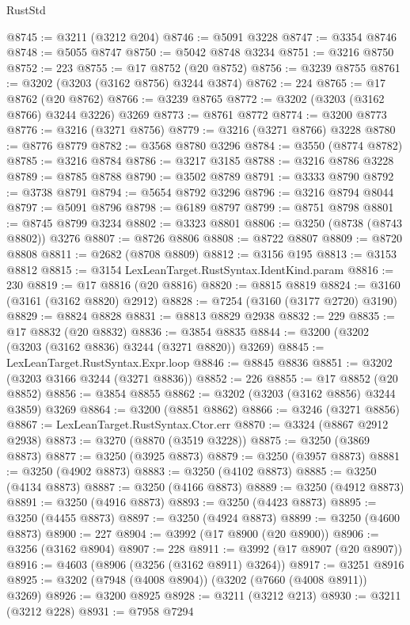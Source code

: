 \begin{lexlean}{RustStd}
\begin{coremodule}
@8745 := @3211 (@3212 @204)
@8746 := @5091 @3228
@8747 := @3354 @8746
@8748 := @5055 @8747
@8750 := @5042 @8748 @3234
@8751 := @3216 @8750
@8752 := 223
@8755 := @17 @8752 (@20 @8752)
@8756 := @3239 @8755
@8761 := @3202 (@3203 (@3162 @8756) @3244 @3874)
@8762 := 224
@8765 := @17 @8762 (@20 @8762)
@8766 := @3239 @8765
@8772 := @3202 (@3203 (@3162 @8766) @3244 @3226) @3269
@8773 := @8761 @8772
@8774 := @3200 @8773
@8776 := @3216 (@3271 @8756)
@8779 := @3216 (@3271 @8766) @3228
@8780 := @8776 @8779
@8782 := @3568 @8780 @3296
@8784 := @3550 (@8774 @8782)
@8785 := @3216 @8784
@8786 := @3217 @3185
@8788 := @3216 @8786 @3228
@8789 := @8785 @8788
@8790 := @3502 @8789
@8791 := @3333 @8790
@8792 := @3738 @8791
@8794 := @5654 @8792 @3296
@8796 := @3216 @8794 @8044
@8797 := @5091 @8796
@8798 := @6189 @8797
@8799 := @8751 @8798
@8801 := @8745 @8799 @3234
@8802 := @3323 @8801
@8806 := @3250 (@8738 (@8743 @8802)) @3276
@8807 := @8726 @8806
@8808 := @8722 @8807
@8809 := @8720 @8808
@8811 := @2682 (@8708 @8809)
@8812 := @3156 @195
@8813 := @3153 @8812
@8815 := @3154 LexLeanTarget.RustSyntax.IdentKind.param
@8816 := 230
@8819 := @17 @8816 (@20 @8816)
@8820 := @8815 @8819
@8824 := @3160 (@3161 (@3162 @8820) @2912)
@8828 := @7254 (@3160 (@3177 @2720) @3190)
@8829 := @8824 @8828
@8831 := @8813 @8829 @2938
@8832 := 229
@8835 := @17 @8832 (@20 @8832)
@8836 := @3854 @8835
@8844 := @3200 (@3202 (@3203 (@3162 @8836) @3244 (@3271 @8820)) @3269)
@8845 := LexLeanTarget.RustSyntax.Expr.loop
@8846 := @8845 @8836
@8851 := @3202 (@3203 @3166 @3244 (@3271 @8836))
@8852 := 226
@8855 := @17 @8852 (@20 @8852)
@8856 := @3854 @8855
@8862 := @3202 (@3203 (@3162 @8856) @3244 @3859) @3269
@8864 := @3200 (@8851 @8862)
@8866 := @3246 (@3271 @8856)
@8867 := LexLeanTarget.RustSyntax.Ctor.err
@8870 := @3324 (@8867 @2912 @2938)
@8873 := @3270 (@8870 (@3519 @3228))
@8875 := @3250 (@3869 @8873)
@8877 := @3250 (@3925 @8873)
@8879 := @3250 (@3957 @8873)
@8881 := @3250 (@4902 @8873)
@8883 := @3250 (@4102 @8873)
@8885 := @3250 (@4134 @8873)
@8887 := @3250 (@4166 @8873)
@8889 := @3250 (@4912 @8873)
@8891 := @3250 (@4916 @8873)
@8893 := @3250 (@4423 @8873)
@8895 := @3250 (@4455 @8873)
@8897 := @3250 (@4924 @8873)
@8899 := @3250 (@4600 @8873)
@8900 := 227
@8904 := @3992 (@17 @8900 (@20 @8900))
@8906 := @3256 (@3162 @8904)
@8907 := 228
@8911 := @3992 (@17 @8907 (@20 @8907))
@8916 := @4603 (@8906 (@3256 (@3162 @8911) @3264))
@8917 := @3251 @8916
@8925 := @3202 (@7948 (@4008 @8904)) (@3202 (@7660 (@4008 @8911)) @3269)
@8926 := @3200 @8925
@8928 := @3211 (@3212 @213)
@8930 := @3211 (@3212 @228)
@8931 := @7958 @7294

\end{coremodule}
\end{lexlean}
